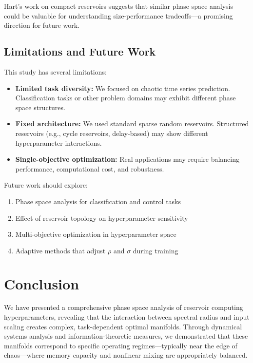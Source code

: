 \documentclass[11pt]{article}
\begin{document}
Hart's work on compact reservoirs \cite{hart2024thesis} suggests that similar phase space analysis could be valuable for understanding size-performance tradeoffs—a promising direction for future work.

\subsection{Limitations and Future Work}

This study has several limitations:

\begin{itemize}
    \item \textbf{Limited task diversity:} We focused on chaotic time series prediction. Classification tasks or other problem domains may exhibit different phase space structures.
    
    \item \textbf{Fixed architecture:} We used standard sparse random reservoirs. Structured reservoirs (e.g., cycle reservoirs, delay-based) may show different hyperparameter interactions.
    
    \item \textbf{Single-objective optimization:} Real applications may require balancing performance, computational cost, and robustness.
\end{itemize}

Future work should explore:
\begin{enumerate}
    \item Phase space analysis for classification and control tasks
    \item Effect of reservoir topology on hyperparameter sensitivity
    \item Multi-objective optimization in hyperparameter space
    \item Adaptive methods that adjust $\rho$ and $\sigma$ during training
\end{enumerate}

\section{Conclusion}

We have presented a comprehensive phase space analysis of reservoir computing hyperparameters, revealing that the interaction between spectral radius and input scaling creates complex, task-dependent optimal manifolds. Through dynamical systems analysis and information-theoretic measures, we demonstrated that these manifolds correspond to specific operating regimes—typically near the edge of chaos—where memory capacity and nonlinear mixing are appropriately balanced.
\end{document}
